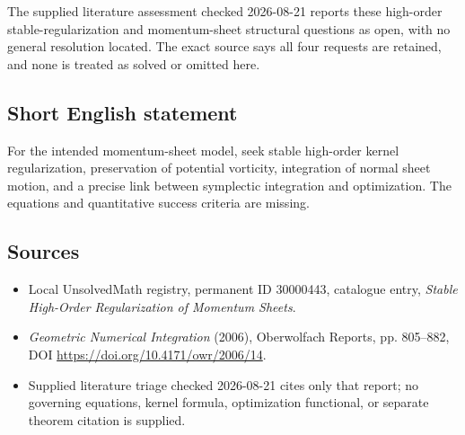 \documentclass[11pt]{article}
\begin{document}
The supplied literature assessment checked 2026-08-21 reports these high-order stable-regularization and momentum-sheet structural questions as open, with no general resolution located. The exact source says all four requests are retained, and none is treated as solved or omitted here.
\subsection{Short English statement}
For the intended momentum-sheet model, seek stable high-order kernel regularization, preservation of potential vorticity, integration of normal sheet motion, and a precise link between symplectic integration and optimization. The equations and quantitative success criteria are missing.
\subsection{Sources}
\begin{itemize}
\item Local UnsolvedMath registry, permanent ID 30000443, catalogue entry, \emph{Stable High-Order Regularization of Momentum Sheets}.
\item \emph{Geometric Numerical Integration} (2006), Oberwolfach Reports, pp. 805--882, DOI \url{https://doi.org/10.4171/owr/2006/14}.
\item Supplied literature triage checked 2026-08-21 cites only that report; no governing equations, kernel formula, optimization functional, or separate theorem citation is supplied.
\end{itemize}
\end{document}
